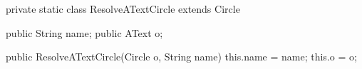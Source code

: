 \begin{tomcode3}[caption=Exemple de classe {\java} générée implémentant un élément \emph{resolve}.,label=code:resolveClassA2Shape]
private static class ResolveATextCircle extends Circle  {
    public String name;
    public AText o;

    public ResolveATextCircle(Circle o, String name) {
      this.name = name;
      this.o = o;
    }
  }
\end{tomcode3}
